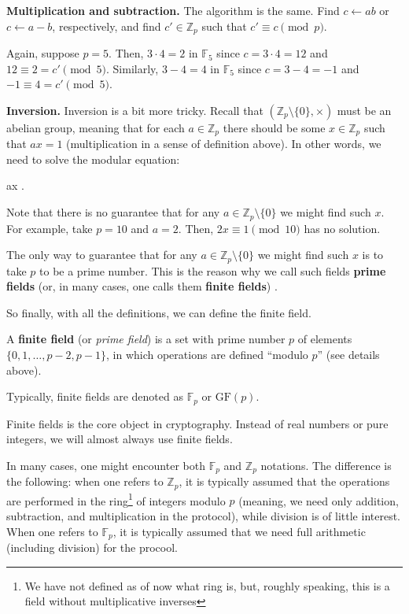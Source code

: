 \documentclass[../lecture-notes-148x210.tex]{subfiles}
\begin{document}
\textbf{Multiplication and subtraction.} The algorithm is the same. Find $c \gets ab$ or $c \gets a-b$, 
respectively, and find $c' \in \mathbb{Z}_p$ such that $c' \equiv c \pmod{p}$.

\begin{example}
    Again, suppose $p=5$. Then, $3 \cdot 4 = 2$ in $\mathbb{F}_5$ since $c=3 \cdot 4 = 12$ and $12 \equiv 2 = c' \pmod{5}$. 
    Similarly, $3-4 = 4$ in $\mathbb{F}_5$ since $c=3-4=-1$ and $-1 \equiv 4 = c' \pmod{5}$.
\end{example}

\textbf{Inversion.} Inversion is a bit more tricky. Recall that $(\mathbb{Z}_p \setminus \{0\}, \times)$ must be 
an abelian group, meaning that for each $a \in \mathbb{Z}_p$ there should be some $x \in \mathbb{Z}_p$ such that 
$ax = 1$ (multiplication in a sense of definition above). In other words, we need to solve the modular equation:
\begin{xequation}
    ax  .
\end{xequation}

Note that there is no guarantee that for any $a \in \mathbb{Z}_p \setminus \{0\}$ we might find such $x$. For 
example, take $p=10$ and $a=2$. Then, $2x \equiv 1 \pmod{10}$ has no solution. 

The only way to guarantee that for any $a \in \mathbb{Z}_p \setminus \{0\}$ we might find such $x$ is to take $p$ 
to be a prime number. This is the reason why we call such fields \textbf{prime fields} (or, in many cases, one 
calls them \textbf{finite fields}) \cite[section 16]{Judson_2012}.

So finally, with all the definitions, we can define the finite field.

\begin{definition}
    A \textbf{finite field} (or \textit{prime field}) is a set with prime number $p$ of elements 
    $\{0,1,\dots,p-2,p-1\}$, in which operations are defined ``modulo $p$'' (see details above). 

    Typically, finite fields are denoted as $\mathbb{F}_p$ or $\text{GF}(p)$.
\end{definition}

Finite fields is the core object in cryptography. Instead of real numbers or pure integers, we will almost always 
use finite fields.

\begin{remark}
    In many cases, one might encounter both $\mathbb{F}_p$ and $\mathbb{Z}_p$ notations. The difference is the 
    following: when one refers to $\mathbb{Z}_p$, it is typically assumed that the operations are performed in 
    the ring\footnote{We have not defined as of now what ring is, but, roughly speaking, this is a field without 
    multiplicative inverses} of integers modulo $p$ (meaning, we need only addition, subtraction, and multiplication 
    in the protocol), while division is of little interest. When one refers to $\mathbb{F}_p$, it is typically 
    assumed that we need full arithmetic (including division) for the procool.
\end{remark}
\end{document}
